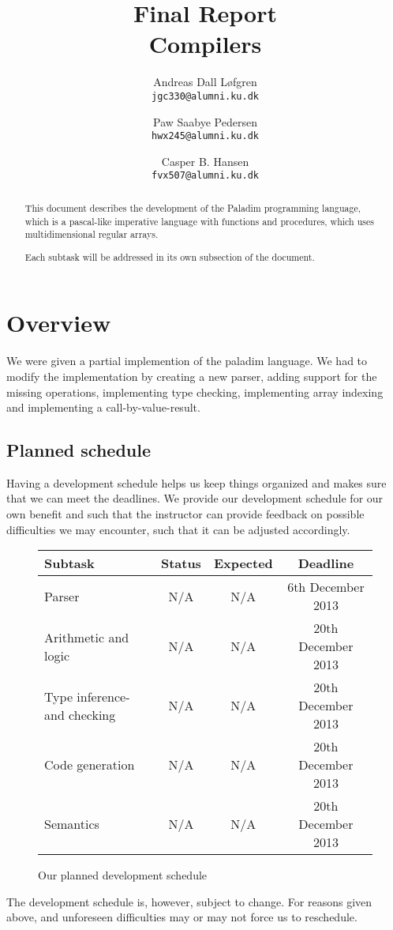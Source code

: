 \documentclass[11pt]{article}
\title%
{%
	{\large Final Report}\\
	Compilers
}
\author%
{%
	Andreas Dall Løfgren\\
	{\tt jgc330@alumni.ku.dk}
	\and
	Paw Saabye Pedersen\\
	{\tt hwx245@alumni.ku.dk}
	\and
	Casper B. Hansen\\
	{\tt fvx507@alumni.ku.dk}
}
\begin{document}
\lstset{basicstyle=\ttfamily\scriptsize}
\clearpage
\maketitle
\thispagestyle{empty}
\begin{multicols}{2}
\begin{abstract}
This document describes the development of the Paladim programming language,
which is a pascal-like imperative language with functions and procedures, which
uses multidimensional regular arrays.

Each subtask will be addressed in its own subsection of the document.
\end{abstract}
\vfill
\columnbreak%
\tableofcontents
\end{multicols}

\clearpage
\section{Overview}
We were given a partial implemention of the paladim language. We had to modify the implementation by creating a new parser, adding support for the missing operations, implementing type checking, implementing array indexing and implementing a call-by-value-result.

\subsection{Planned schedule}
Having a development schedule helps us keep things organized and makes sure
that we can meet the deadlines. We provide our development schedule for our
own benefit and such that the instructor can provide feedback on possible
difficulties we may encounter, such that it can be  adjusted accordingly.
\begin{figure}[H]
	\centering
	\begin{tabular}{|l|c|c|c|}
		\hline
		{\bf Subtask} & {\bf Status} & {\bf Expected} & {\bf Deadline} \\ \hline
		Parser & N/A & N/A & 6th December 2013 \\ \hline
		Arithmetic and logic & N/A & N/A & 20th December 2013 \\ \hline
		Type inference- and checking & N/A & N/A & 20th December 2013 \\ \hline
		Code generation & N/A & N/A & 20th December 2013 \\ \hline
		Semantics & N/A & N/A & 20th December 2013 \\ \hline
	\end{tabular}
	\label{table:schedule}
	\caption{Our planned development schedule}
\end{figure}
The development schedule is, however, subject to change. For reasons given
above, and unforeseen difficulties may or may not force us to reschedule.
\end{document}
